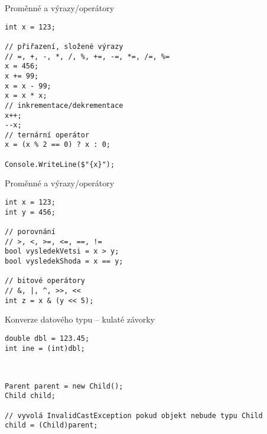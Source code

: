 

\begin{frame}[fragile]
\begin{exampleblock}{Proměnné a výrazy/operátory}
\begin{lstlisting}
int x = 123;

// přiřazení, složené výrazy
// =, +, -, *, /, %, +=, -=, *=, /=, %=
x = 456;
x += 99;
x = x - 99;
x = x * x;
// inkrementace/dekrementace
x++;
--x;
// ternární operátor
x = (x % 2 == 0) ? x : 0;

Console.WriteLine($"{x}");
\end{lstlisting}
\end{exampleblock}
\end{frame}


\begin{frame}[fragile]
\begin{exampleblock}{Proměnné a výrazy/operátory}
\begin{lstlisting}
int x = 123;
int y = 456;

// porovnání
// >, <, >=, <=, ==, !=
bool vysledekVetsi = x > y;
bool vysledekShoda = x == y;

// bitové operátory
// &, |, ^, >>, <<
int z = x & (y << 5);

\end{lstlisting}
\end{exampleblock}
\end{frame}



\begin{frame}[fragile]
\vfill
\begin{exampleblock}{Konverze datového typu -- kulaté závorky}
\begin{lstlisting}[basicstyle=\small]
double dbl = 123.45;
int ine = (int)dbl;
\end{lstlisting}
\end{exampleblock}
\vfill
\begin{exampleblock}{~}
\begin{lstlisting}[basicstyle=\small]
Parent parent = new Child();
Child child;

// vyvolá InvalidCastException pokud objekt nebude typu Child
child = (Child)parent; 
\end{lstlisting}
\end{exampleblock}
\vfill
\end{frame}





